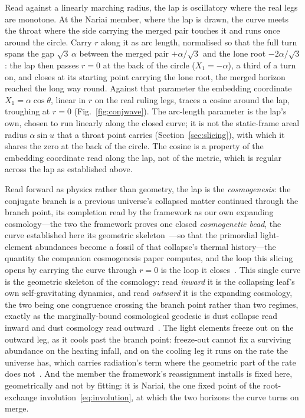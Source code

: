 \documentclass[11pt,a4paper]{article}
\theoremstyle{definition}
\begin{document}
Read against a linearly marching radius, the lap is oscillatory where the real legs are monotone. At the Nariai member, where the lap is drawn, the curve meets the throat where the side carrying the merged pair touches it and runs once around the circle. Carry $r$ along it as arc length, normalised so that the full turn spans the gap $\sqrt3\,\alpha$ between the merged pair $+\alpha/\sqrt3$ and the lone root $-2\alpha/\sqrt3$: the lap then passes $r=0$ at the back of the circle ($X_{1}=-\alpha$), a third of a turn on, and closes at its starting point carrying the lone root, the merged horizon reached the long way round. Against that parameter the embedding coordinate $X_{1}=\alpha\cos\theta$, linear in $r$ on the real ruling legs, traces a cosine around the lap, troughing at $r=0$ (Fig.~\ref{fig:conjwave}). The arc-length parameter is the lap's own, chosen to run linearly along the closed curve; it is not the static-frame areal radius $\alpha\sin u$ that a throat point carries (Section~\ref{sec:slicing}), with which it shares the zero at the back of the circle. The cosine is a property of the embedding coordinate read along the lap, not of the metric, which is regular across the lap as established above.

Read forward as physics rather than geometry, the lap is the \emph{cosmogenesis}: the conjugate branch is a previous universe's collapsed matter continued through the branch point, its completion read by the framework as our own expanding cosmology---the two the framework proves one closed \emph{cosmogenetic bead}, the curve established here its geometric skeleton~\cite{JanzenCRframework}---so that the primordial light-element abundances become a fossil of that collapse's thermal history---the quantity the companion cosmogenesis paper computes, and the loop this slicing opens by carrying the curve through $r=0$ is the loop it closes~\cite{JanzenCosmogenesis}. This single curve is the geometric skeleton of the cosmology: read \emph{inward} it is the collapsing leaf's own self-gravitating dynamics, and read \emph{outward} it is the expanding cosmology, the two being one congruence crossing the branch point rather than two regimes, exactly as the marginally-bound cosmological geodesic is dust collapse read inward and dust cosmology read outward~\cite{JanzenCRframework, JanzenCosmogenesis}. The light elements freeze out on the outward leg, as it cools past the branch point: freeze-out cannot fix a surviving abundance on the heating infall, and on the cooling leg it runs on the rate the universe has, which carries radiation's term where the geometric part of the rate does not~\cite{JanzenCRframework, JanzenCosmogenesis}. And the member the framework's reassignment installs is fixed here, geometrically and not by fitting: it is Nariai, the one fixed point of the root-exchange involution~\eqref{eq:involution}, at which the two horizons the curve turns on merge.
\end{document}
